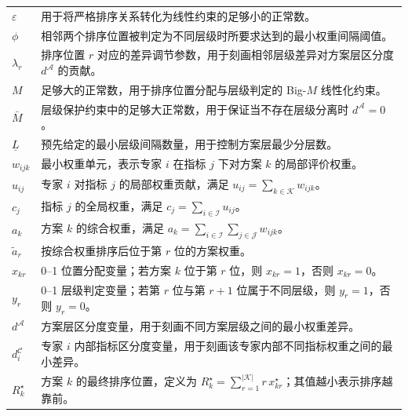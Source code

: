 \documentclass{article}
\begin{document}
\begin{longtable}{p{1cm} p{14cm}}
$\varepsilon$ 
& 用于将严格排序关系转化为线性约束的足够小的正常数。 \\

$\phi$ 
& 相邻两个排序位置被判定为不同层级时所要求达到的最小权重间隔阈值。 \\

$\lambda_r$ 
& 排序位置 $r$ 对应的差异调节参数，用于刻画相邻层级差异对方案层区分度 $d^{\mathcal A}$ 的贡献。 \\

$M$ 
& 足够大的正常数，用于排序位置分配与层级判定的 Big-$M$ 线性化约束。 \\

$\bar M$ 
& 层级保护约束中的足够大正常数，用于保证当不存在层级分离时 $d^{\mathcal A}=0$。 \\

$\underline L$ 
& 预先给定的最小层级间隔数量，用于控制方案层最少分层数。 \\

$w_{ijk}$ 
& 最小权重单元，表示专家 $i$ 在指标 $j$ 下对方案 $k$ 的局部评价权重。 \\

$u_{ij}$ 
& 专家 $i$ 对指标 $j$ 的局部权重贡献，满足 $u_{ij}=\sum_{k\in\mathcal K}w_{ijk}$。 \\

$c_j$ 
& 指标 $j$ 的全局权重，满足 $c_j=\sum_{i\in\mathcal I}u_{ij}$。 \\

$a_k$ 
& 方案 $k$ 的综合权重，满足 $a_k=\sum_{i\in\mathcal I}\sum_{j\in\mathcal J}w_{ijk}$。 \\

$\tilde a_r$ 
& 按综合权重排序后位于第 $r$ 位的方案权重。 \\

$x_{kr}$ 
& 0--1 位置分配变量；若方案 $k$ 位于第 $r$ 位，则 $x_{kr}=1$，否则 $x_{kr}=0$。 \\

$y_r$ 
& 0--1 层级判定变量；若第 $r$ 位与第 $r+1$ 位属于不同层级，则 $y_r=1$，否则 $y_r=0$。 \\

$d^{\mathcal A}$ 
& 方案层区分度变量，用于刻画不同方案层级之间的最小权重差异。 \\

$d_i^{\mathcal C}$ 
& 专家 $i$ 内部指标区分度变量，用于刻画该专家内部不同指标权重之间的最小差异。 \\

$R_k^\star$ 
& 方案 $k$ 的最终排序位置，定义为 $R_k^\star=\sum_{r=1}^{|\mathcal K|}r\,x_{kr}^\star$；其值越小表示排序越靠前。 \\

\end{longtable}
\end{document}
